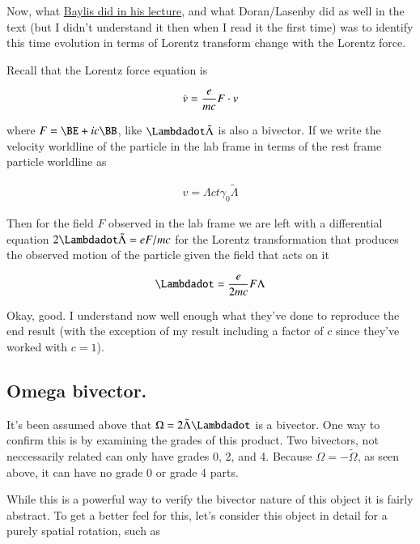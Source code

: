 \documentclass{article}
\newcommand{\reverse}[1]{\tilde{{#1}}}
\begin{document}
Now, what 
\href{http://www.ime.unicamp.br/%7Eicca8/videos/baylis.avi}{Baylis did in his lecture}, and what Doran/Lasenby did as
well in the text (but I didn't understand it then when I read it the first time) was to identify this time evolution
in terms of Lorentz transform change with the Lorentz force.

Recall that the Lorentz force equation is

\begin{align}\label{eqn:LorentzForce}
\dot{v} = \frac{e}{m c} F \cdot v
\end{align}

where $F = \BE + i c \BB$, like $\Lambdadot\reverse{\Lambda}$ is also a bivector.  If we write the velocity worldline
of the particle in the lab frame in terms of the rest frame particle worldline as

\begin{align*}
v = \Lambda c t \gamma_0 \reverse{\Lambda}
\end{align*}

Then for the field $F$ observed in the lab frame we are left with a differential equation 
$2 \Lambdadot \reverse{\Lambda} = e F / mc$
for the Lorentz transformation
that produces the observed motion of the particle given the field that acts on it

\begin{align}\label{eqn:LorentzTxEvolution}
\Lambdadot = \frac{e}{2 m c} F \Lambda
\end{align}

Okay, good.  I understand now well enough what they've done to reproduce the end result (with the exception of my 
result including a factor of $c$ since they've worked with $c=1$).

\subsection{ Omega bivector. }

It's been assumed above that $\Omega = 2 \reverse{\Lambda} \Lambdadot$ is a bivector.  One way to confirm this is by examining the grades of this product.  Two bivectors, not neccessarily related can only have grades 0, 2, and 4.  Because $\Omega = -\reverse{\Omega}$, as seen above, it can have no grade 0 or grade 4 parts.

While this is a powerful way to verify the bivector nature of this object it is fairly abstract.  To get a better feel for this, let's 
consider this object in detail for a purely spatial rotation, such as
\end{document}
